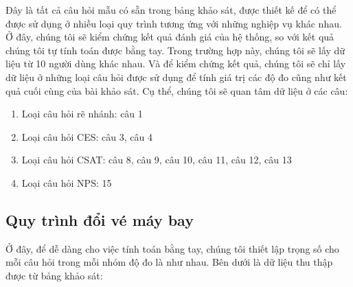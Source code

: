 Đây là tất cả câu hỏi mẫu có sẵn trong bảng khảo sát, được thiết kế để có thể được sử dụng ở nhiều loại quy trình tương ứng với những nghiệp vụ khác nhau. 
Ở đây, chúng tôi sẽ kiểm chứng kết quả đánh giá của hệ thống, so với kết quả chúng tôi tự tính toán được bằng tay. Trong trường hợp này, 
chúng tôi sẽ lấy dữ liệu từ 10 người dùng khác nhau. Và để kiểm chứng kết quả, chúng tôi sẽ chỉ lấy dữ liệu ở những loại câu hỏi được sử dụng để 
tính giá trị các độ đo cũng như kết quả cuối cùng của bài khảo sát. Cụ thể, chúng tôi sẽ quan tâm dữ liệu ở các câu:
\begin{enumerate}
    \item Loại câu hỏi rẽ nhánh: câu 1
    \item Loại câu hỏi CES: câu 3, câu 4
    \item Loại câu hỏi CSAT: câu 8, câu 9, câu 10, câu 11, câu 12, câu 13
    \item Loại câu hỏi NPS: 15
\end{enumerate}

\subsection{Quy trình đổi vé máy bay}

Ở đây, để dễ dàng cho việc tính toán bằng tay, chúng tôi thiết lập trọng số cho mỗi câu hỏi trong mỗi nhóm độ đo là như nhau. Bên dưới là dữ liệu thu thập được từ bảng khảo sát:

